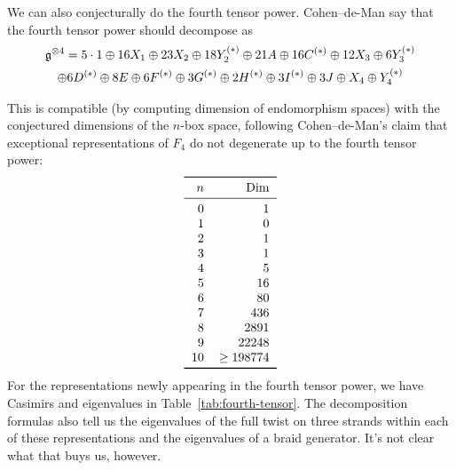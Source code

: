 \documentclass[12pt]{amsart}
\begin{document}
We can also conjecturally do the fourth tensor power. Cohen--de-Man
\cite{MR1381778} say that the fourth tensor power should decompose as
\begin{multline*}
{\mathfrak g}^{\otimes4} = 5\cdot 1 \oplus 16X_1 \oplus 23X_2 \oplus 18Y_2^{(*)}
  \oplus 21A \oplus 16C^{(*)} \oplus 12X_3 \oplus 6Y_3^{(*)} \\
  \oplus 6D^{(*)} \oplus 8E \oplus 6F^{(*)} \oplus 3G^{(*)} \oplus 2H^{(*)}
    \oplus 3I^{(*)} \oplus 3J \oplus X_4 \oplus Y_4^{(*)}
\end{multline*}

This is compatible (by computing dimension of endomorphism spaces)
with the conjectured dimensions of the $n$-box space, following
Cohen--de-Man's claim that exceptional representations of $F_4$ do not
degenerate up to the fourth tensor power:
\[
\begin{tabular}{rr}
  \toprule
  $n$ & Dim\\ \midrule
  0 & 1 \\ 1 & 0 \\ 2 & 1 \\ 3 & 1 \\ 4 & 5 \\ 5 & 16 \\
  6 & 80 \\ 7 & 436 \\ 8 & 2891 \\ 9 & 22248 \\ 10 & $\ge 198774$ \\
  \bottomrule
\end{tabular}
\]
For the representations newly appearing in the fourth tensor power, we
have Casimirs and eigenvalues in Table~\ref{tab:fourth-tensor}. The
decomposition formulas also
tell us the eigenvalues of the full twist on three strands within each
of these representations and the eigenvalues of a braid
generator. It's not clear what that buys us, however.
\end{document}
